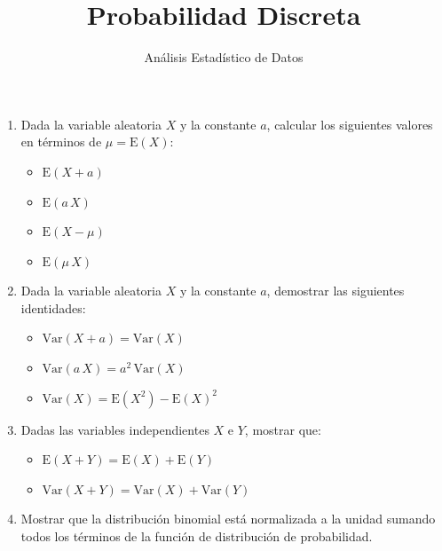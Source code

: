 \documentclass[a4paper,11pt]{article}
\title{Probabilidad Discreta}
\author{Análisis Estadístico de Datos}
\date{}
\begin{document}
\maketitle

\begin{enumerate}

\item Dada la variable aleatoria $X$ y la constante $a$, calcular los siguientes valores en términos de $\mu=\mathrm{E}(X)$:

\begin{itemize}

    \item $\mathrm{E}(X+a)$

    \item $\mathrm{E}(a\,X)$
    
    \item $\mathrm{E}(X-\mu)$

    \item $\mathrm{E}( \mu \, X)$ 
    
\end{itemize}

\item Dada la variable aleatoria $X$ y la constante $a$, demostrar las siguientes identidades:

\begin{itemize}

    \item $\mathrm{Var}(X+a) = \mathrm{Var}(X)$
    
    \item $\mathrm{Var}(a\,X) = a^2 \, \mathrm{Var}(X)$

    \item $\mathrm{Var}(X) = \mathrm{E}(X^2) - \mathrm{E}(X)^2$
    
\end{itemize}

\item Dadas las variables independientes $X$ e $Y$, mostrar que:

\begin{itemize}

    \item $\mathrm{E}(X+Y) = \mathrm{E}(X) + \mathrm{E}(Y)$ 
    
    \item $\mathrm{Var}(X+Y) = \mathrm{Var}(X) + \mathrm{Var}(Y)$ 

\end{itemize}

\item Mostrar que la distribución binomial está normalizada a la unidad sumando todos los términos de la función de distribución de probabilidad.


\end{enumerate}
\end{document}
